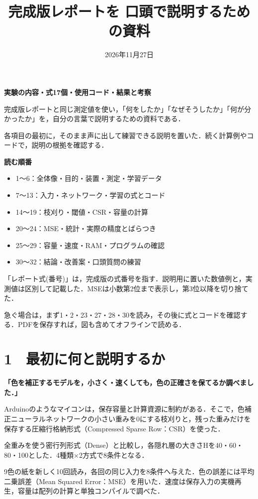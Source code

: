 \documentclass[
  14pt,
  a5paper,
]{extarticle}
\title{完成版レポートを 口頭で説明するための資料}
\author{}
\date{2026年11月27日}
\makeatletter
\providecommand{\tightlist}{%
  \setlength{\itemsep}{0pt}\setlength{\parskip}{0pt}}
\renewcommand{\maketitle}{\begin{center}\vspace*{-4mm}{\LARGE\bfseries\@title\par}\vspace{3mm}{\normalsize\@date\par}\end{center}}
\makeatother
\begin{document}
\maketitle

\textbf{実験の内容・式17個・使用コード・結果と考察}

完成版レポートと同じ測定値を使い，「何をしたか」「なぜそうしたか」「何が分かったか」を，自分の言葉で説明するための資料である．

各項目の最初に，そのまま声に出して練習できる説明を置いた．続く計算例やコードで，説明の根拠を確認する．

\textbf{読む順番}

\begin{itemize}
\tightlist
\item
  1〜6：全体像・目的・装置・測定・学習データ
\item
  7〜13：入力・ネットワーク・学習の式とコード
\item
  14〜19：枝刈り・閾値・CSR・容量の計算
\item
  20〜24：MSE・統計・実際の精度とばらつき
\item
  25〜29：容量・速度・RAM・プログラムの確認
\item
  30〜32：結論・改善案・口頭質問の練習
\end{itemize}

「レポート式(番号)」は，完成版の式番号を指す．説明用に置いた数値例と，実測値は区別して記載した．MSEは小数第2位まで表示し，第3位以降を切り捨てた．

急ぐ場合は，まず1・2・23・27・28・30を読み，その後に式とコードを確認する．PDFを保存すれば，図も含めてオフラインで読める．

\newpage

\section{1　最初に何と説明するか}\label{ux6700ux521dux306bux4f55ux3068ux8aacux660eux3059ux308bux304b}

\textbf{「色を補正するモデルを，小さく・速くしても，色の正確さを保てるか調べました．」}

Arduinoのようなマイコンは，保存容量と計算資源に制約がある．そこで，色補正ニューラルネットワークの小さい重みを0にする枝刈りと，残った重みだけを保存する圧縮行格納形式（Compressed
Sparse Row：CSR）を使った．

全重みを使う密行列形式（Dense）と比較し，各隠れ層の大きさHを40・60・80・100とした．4種類×2方式で8条件となる．

9色の紙を新しく10回読み，各回の同じ入力を8条件へ与えた．色の誤差には平均二乗誤差（Mean
Squared
Error：MSE）を用いた．速度は保存入力の実機再生，容量は配列の計算と単独コンパイルで調べた．
\end{document}
